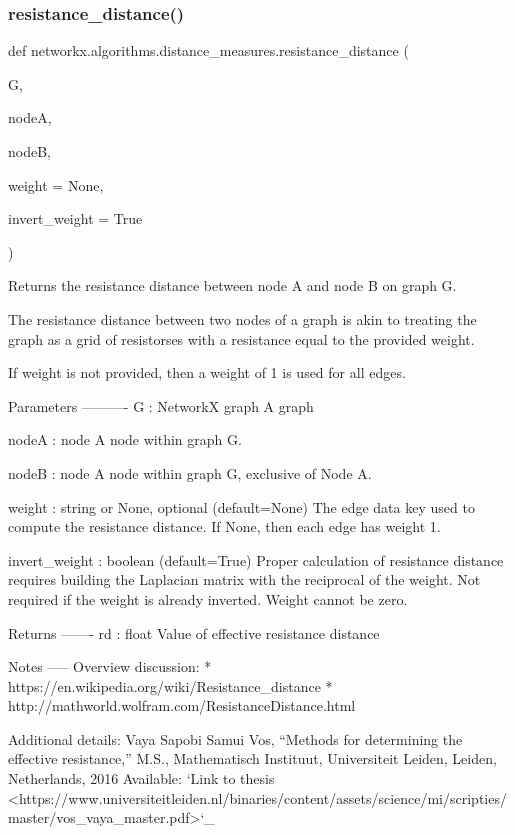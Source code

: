 \subsubsection{\texorpdfstring{resistance\+\_\+distance()}{resistance\_distance()}}
{\footnotesize\ttfamily def networkx.\+algorithms.\+distance\+\_\+measures.\+resistance\+\_\+distance (\begin{DoxyParamCaption}\item[{}]{G,  }\item[{}]{nodeA,  }\item[{}]{nodeB,  }\item[{}]{weight = {\ttfamily None},  }\item[{}]{invert\+\_\+weight = {\ttfamily True} }\end{DoxyParamCaption})}

\begin{DoxyVerb}Returns the resistance distance between node A and node B on graph G.

The resistance distance between two nodes of a graph is akin to treating
the graph as a grid of resistorses with a resistance equal to the provided
weight.

If weight is not provided, then a weight of 1 is used for all edges.

Parameters
----------
G : NetworkX graph
   A graph

nodeA : node
  A node within graph G.

nodeB : node
  A node within graph G, exclusive of Node A.

weight : string or None, optional (default=None)
   The edge data key used to compute the resistance distance.
   If None, then each edge has weight 1.

invert_weight : boolean (default=True)
    Proper calculation of resistance distance requires building the
    Laplacian matrix with the reciprocal of the weight. Not required
    if the weight is already inverted. Weight cannot be zero.

Returns
-------
rd : float
   Value of effective resistance distance

Notes
-----
Overview discussion:
* https://en.wikipedia.org/wiki/Resistance_distance
* http://mathworld.wolfram.com/ResistanceDistance.html

Additional details:
Vaya Sapobi Samui Vos, “Methods for determining the effective resistance,” M.S.,
Mathematisch Instituut, Universiteit Leiden, Leiden, Netherlands, 2016
Available: `Link to thesis <https://www.universiteitleiden.nl/binaries/content/assets/science/mi/scripties/master/vos_vaya_master.pdf>`_
\end{DoxyVerb}
 